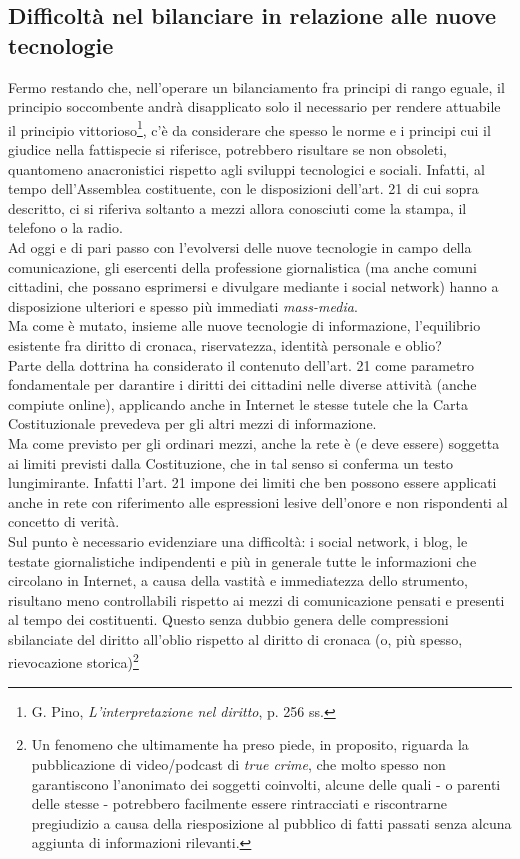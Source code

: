 \subsection{Difficoltà nel bilanciare in relazione alle nuove tecnologie}
Fermo restando che, nell'operare un bilanciamento fra principi di rango eguale, il principio soccombente andrà disapplicato solo il necessario per rendere attuabile il principio vittorioso\footnote{G. Pino, \textit{L'interpretazione nel diritto}, p. 256 ss.}, c'è da considerare che spesso le norme e i principi cui il giudice nella fattispecie si riferisce, potrebbero risultare se non obsoleti, quantomeno anacronistici rispetto agli sviluppi tecnologici e sociali.
Infatti, al tempo dell'Assemblea costituente, con le disposizioni dell'art. 21 di cui sopra descritto, ci si riferiva soltanto a mezzi allora conosciuti come la stampa, il telefono o la radio.
\\Ad oggi e di pari passo con l'evolversi delle nuove tecnologie in campo della comunicazione, gli esercenti della professione giornalistica (ma anche comuni cittadini, che possano esprimersi e divulgare mediante i social network) hanno a disposizione ulteriori e spesso più immediati \textit{mass-media}.
\\Ma come è mutato, insieme alle nuove tecnologie di informazione, l'equilibrio esistente fra diritto di cronaca, riservatezza, identità personale e oblio?
\\Parte della dottrina ha considerato il contenuto dell'art. 21 come parametro fondamentale per darantire i diritti dei cittadini nelle diverse attività (anche compiute online), applicando anche in Internet le stesse tutele che la Carta Costituzionale prevedeva per gli altri mezzi di informazione.
\\Ma come previsto per gli ordinari mezzi, anche la rete è (e deve essere) soggetta ai limiti previsti dalla Costituzione, che in tal senso si conferma un testo lungimirante.
Infatti l'art. 21 impone dei limiti che ben possono essere applicati anche in rete con riferimento alle espressioni lesive dell'onore e non rispondenti al concetto di verità.
\\Sul punto è necessario evidenziare una difficoltà: i social network, i blog, le testate giornalistiche indipendenti e più in generale tutte le informazioni che circolano in Internet, a causa della vastità e immediatezza dello strumento, risultano meno controllabili rispetto ai mezzi di comunicazione pensati e presenti al tempo dei costituenti.
Questo senza dubbio genera delle compressioni sbilanciate del diritto all'oblio rispetto al diritto di cronaca (o, più spesso, rievocazione storica)\footnote{Un fenomeno che ultimamente ha preso piede, in proposito, riguarda la pubblicazione di video/podcast di \textit{true crime}, che molto spesso non garantiscono l'anonimato dei soggetti coinvolti, alcune delle quali - o parenti delle stesse - potrebbero facilmente essere rintracciati e riscontrarne pregiudizio a causa della riesposizione al pubblico di fatti passati senza alcuna aggiunta di informazioni rilevanti.}
